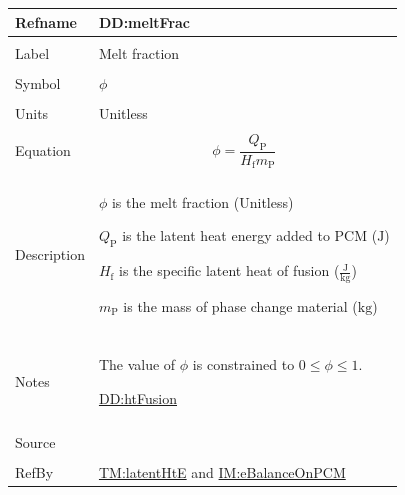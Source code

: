 \documentclass[12pt]{article}
\begin{document}
\vspace{\baselineskip}
\noindent
\begin{minipage}{\textwidth}
\begin{tabular}{>{\raggedright}p{}>{\raggedright\arraybackslash}p{}}
\toprule \textbf{Refname} & \textbf{DD:meltFrac}
\label{DD:meltFrac}
\\ \midrule \\
Label & Melt fraction
        
\\ \midrule \\
Symbol & $ϕ$
         
\\ \midrule \\
Units & Unitless
        
\\ \midrule \\
Equation & \begin{displaymath}
           ϕ=\frac{{Q_{\text{P}}}}{{H_{\text{f}}} {m_{\text{P}}}}
           \end{displaymath}
\\ \midrule \\
Description & \begin{symbDescription}
              \item{$ϕ$ is the melt fraction (Unitless)}
              \item{${Q_{\text{P}}}$ is the latent heat energy added to PCM (${\text{J}}$)}
              \item{${H_{\text{f}}}$ is the specific latent heat of fusion ($\frac{\text{J}}{\text{kg}}$)}
              \item{${m_{\text{P}}}$ is the mass of phase change material (${\text{kg}}$)}
              \end{symbDescription}
\\ \midrule \\
Notes & The value of $ϕ$ is constrained to $0\leq{}ϕ\leq{}1$.
        
        \hyperref[DD:htFusion]{DD:htFusion}
        
\\ \midrule \\
Source & \cite{koothoor2013}
         
\\ \midrule \\
RefBy & \hyperref[TM:latentHtE]{TM:latentHtE} and \hyperref[IM:eBalanceOnPCM]{IM:eBalanceOnPCM}
        
\\ \bottomrule
\end{tabular}
\end{minipage}
\end{document}
